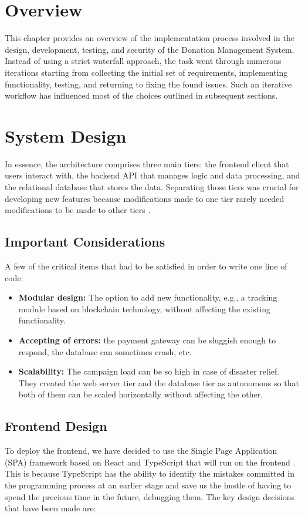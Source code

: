 \documentclass{thesis-library}
\begin{document}
\section{Overview}
This chapter provides an overview of the implementation process involved in the design, development, testing, and security of the Donation Management System. Instead of using a strict waterfall approach, the task went through numerous iterations starting from collecting the initial set of requirements, implementing functionality, testing, and returning to fixing the found issues. Such an iterative workflow has influenced most of the choices outlined in subsequent sections.

\section{System Design}
In essence, the architecture comprises three main tiers: the frontend client that users interact with, the backend API that manages logic and data processing, and the relational database that stores the data. Separating those tiers was crucial for developing new features because modifications made to one tier rarely needed modifications to be made to other tiers \cite{jones2023modern}.

\subsection{Important Considerations}
A few of the critical items that had to be satisfied in order to write one line of code:

\begin{itemize}
    \item \textbf{Modular design:} The option to add new functionality, e.g., a tracking module based on blockchain technology, without affecting the existing functionality.
    \item \textbf{Accepting of errors:} the payment gateway can be sluggish enough to respond, the database can sometimes crash, etc.
    \item \textbf{Scalability:} The campaign load can be so high in case of disaster relief. They created the web server tier and the database tier as autonomous so that both of them can be scaled horizontally without affecting the other.
\end{itemize}

\subsection{Frontend Design}
To deploy the frontend, we have decided to use the Single Page Application (SPA) framework based on React and TypeScript that will run on the frontend \cite{cherny2019programming}. This is because TypeScript has the ability to identify the mistakes committed in the programming process at an earlier stage and save us the hustle of having to spend the precious time in the future, debugging them. The key design decisions that have been made are:
\end{document}
